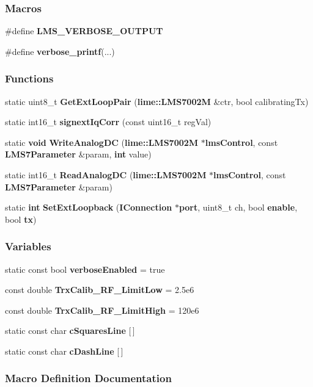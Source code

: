 \subsubsection*{Macros}
\begin{DoxyCompactItemize}
\item 
\#define {\bf L\+M\+S\+\_\+\+V\+E\+R\+B\+O\+S\+E\+\_\+\+O\+U\+T\+P\+UT}
\item 
\#define {\bf verbose\+\_\+printf}(...)
\end{DoxyCompactItemize}
\subsubsection*{Functions}
\begin{DoxyCompactItemize}
\item 
static uint8\+\_\+t {\bf Get\+Ext\+Loop\+Pair} ({\bf lime\+::\+L\+M\+S7002M} \&ctr, bool calibrating\+Tx)
\item 
static int16\+\_\+t {\bf signext\+Iq\+Corr} (const uint16\+\_\+t reg\+Val)
\item 
static {\bf void} {\bf Write\+Analog\+DC} ({\bf lime\+::\+L\+M\+S7002M} $\ast${\bf lms\+Control}, const {\bf L\+M\+S7\+Parameter} \&param, {\bf int} value)
\item 
static int16\+\_\+t {\bf Read\+Analog\+DC} ({\bf lime\+::\+L\+M\+S7002M} $\ast${\bf lms\+Control}, const {\bf L\+M\+S7\+Parameter} \&param)
\item 
static {\bf int} {\bf Set\+Ext\+Loopback} ({\bf I\+Connection} $\ast${\bf port}, uint8\+\_\+t ch, bool {\bf enable}, bool {\bf tx})
\end{DoxyCompactItemize}
\subsubsection*{Variables}
\begin{DoxyCompactItemize}
\item 
static const bool {\bf verbose\+Enabled} = true
\item 
const double {\bf Trx\+Calib\+\_\+\+R\+F\+\_\+\+Limit\+Low} = 2.\+5e6
\item 
const double {\bf Trx\+Calib\+\_\+\+R\+F\+\_\+\+Limit\+High} = 120e6
\item 
static const char {\bf c\+Squares\+Line} [$\,$]
\item 
static const char {\bf c\+Dash\+Line} [$\,$]
\end{DoxyCompactItemize}


\subsubsection{Macro Definition Documentation}
